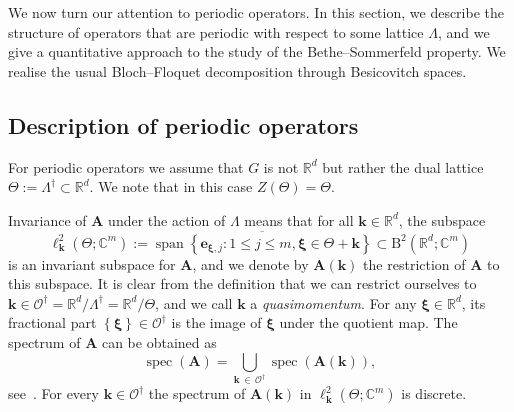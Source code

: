 \documentclass[10pt]{amsart}
\theoremstyle{definition}\newtheorem{defi}[theo]{Definition}\newtheorem{rema}[theo]{Remark}\newtheorem{exam}[theo]{Example}\newtheorem{nota}[theo]{Notation}
\DeclareMathOperator{\spann}{span}
\DeclareMathOperator{\spec}{spec}
\newcommand{\RB}{\mathrm{B}}
\newcommand{\R}{\mathbb R}
\newcommand{\C}{\mathbb C}
\newcommand{\CO}{\mathcal{O}}
\newcommand{\bxi}{\boldsymbol \xi}
\newcommand{\BA}{\mathbf A}
\newcommand{\be}{\mathbf e}
\newcommand{\bk}{\mathbf k}
\newcommand{\set}[1]{\left\{ #1 \right\}}
\begin{document}
We now turn our attention to periodic operators. In this section, we describe the structure of operators that are periodic with respect to some lattice $\Lambda$, and we give a quantitative approach to the study of the Bethe--Sommerfeld property. We realise the usual Bloch--Floquet decomposition through Besicovitch spaces.


\subsection{Description of periodic operators}
For periodic operators we assume that $G$ is not $\R^d$ but rather the dual lattice $\Theta := \Lambda^\dagger \subset \R^d$. We note that in this case $Z(\Theta) = \Theta$.

Invariance of $\BA$ under the action of $\Lambda$ means that for all $\bk \in \R^d$, the subspace
\begin{equation}\label{eq:invsubspace}
\ell^2_\bk(\Theta;\C^m) := \overline{\spann \set{\be_{\bxi,j} : 1 \le j \le m, \bxi \in
\Theta + \bk} } \subset \RB^2\left(\R^d;\C^m\right)
\end{equation}
is an invariant subspace for $\BA$, and we denote by $\BA(\bk)$ the restriction of $\BA$ to this subspace. It is clear from the definition that we can restrict ourselves to $\bk \in \CO^\dagger = \R^d/\Lambda^\dagger = \R^d/\Theta$, and we call $\bk$ a
\emph{quasimomentum}. For any $\bxi \in \R^d$, its fractional part $\set \bxi \in
\CO^\dagger$ is the image of $\bxi$ under the quotient map. The spectrum of $\BA$ can be obtained as
\begin{equation}
\spec(\BA) = \bigcup_{\bk\,\in\,\CO^\dagger} \spec(\BA(\bk)),
\end{equation}
see~\cite[Theorem~4.5.1]{ Kuchment}. For every $\bk \in \CO^\dagger$ the spectrum of $\BA(\bk)$ in $\ell^2_\bk(\Theta;\C^m)$ is discrete.
\end{document}
